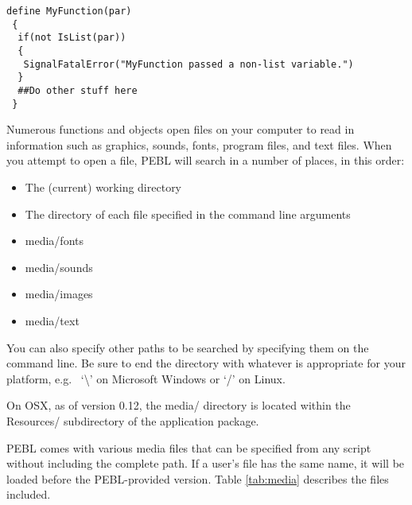 \begin{verbatim}
define MyFunction(par)
 {
  if(not IsList(par))
  {
   SignalFatalError("MyFunction passed a non-list variable.")
  }
  ##Do other stuff here
 }
\end{verbatim}
 



Numerous functions and objects open files on your computer to read in
information such as graphics, sounds, fonts, program files, and text files.  When you attempt to open a file, PEBL will search in a number of places, 
in this order:
\begin{itemize}
\item
The (current) working directory
\item
The directory of each file specified in the command line arguments
\item
media/fonts
\item
media/sounds
\item
media/images
\item
media/text
\end{itemize}
  
You can also specify other paths to be searched by specifying them on the command line.  Be sure to end the directory with whatever is appropriate for your platform, e.g.~ `\textbackslash' on Microsoft Windows or `/' on Linux.

On OSX, as of version 0.12, the media/ directory is located within the Resources/ subdirectory of the application package.

\label{sec:media}

PEBL comes with various media files that can be specified from 
any script without including the complete path.  If a user's file has
the same name, it will be loaded before the PEBL-provided version.
Table \ref{tab:media} describes the files included.
\vspace{1cm}


